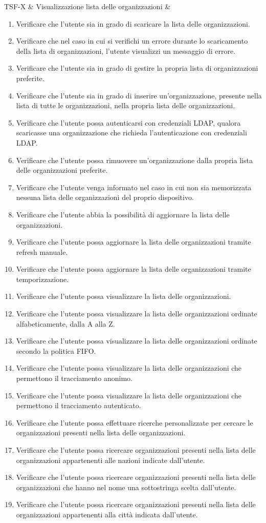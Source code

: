 TSF-X & Visualizzazione lista delle organizzazioni & \begin{enumerate}
\item Verificare che l'utente sia in grado di scaricare la lista delle organizzazioni.
\item Verificare che nel caso in cui si verifichi un errore durante lo scaricamento della lista di organizzazioni, l'utente visualizzi un messaggio di errore.
\item Verificare che l'utente sia in grado di gestire la propria lista di organizzazioni preferite.
\item Verificare che l'utente sia in grado di inserire un'organizzazione, presente nella lista di tutte le organizzazioni,  nella propria lista delle organizzazioni.
\item Verificare che l'utente possa autenticarsi con credenziali LDAP, qualora scaricasse una organizzazione che richieda l'autenticazione con credenziali LDAP.
\item Verificare che l'utente possa rimuovere un'organizzazione dalla propria lista delle organizzazioni preferite.
\item Verificare che l'utente venga informato nel caso in cui non sia memorizzata nessuna lista delle organizzazioni del proprio dispositivo.
\item Verificare che l'utente abbia la possibilità di aggiornare la lista delle organizzazioni.
\item Verificare che l'utente possa aggiornare la lista delle organizzazioni tramite refresh manuale.
\item Verificare che l'utente possa aggiornare la lista delle organizzazioni tramite temporizzazione.
\item Verificare che l'utente possa visualizzare la lista delle organizzazioni.
\item Verificare che l'utente possa visualizzare la lista delle organizzazioni ordinate alfabeticamente, dalla A alla Z.
\item Verificare che l'utente possa visualizzare la lista delle organizzazioni ordinate secondo la politica FIFO.
\item Verificare che l'utente possa visualizzare la lista delle organizzazioni che permettono il tracciamento anonimo.
\item Verificare che l'utente possa visualizzare la lista delle organizzazioni che permettono il tracciamento autenticato.
\item Verificare che l'utente possa effettuare ricerche personalizzate per cercare le organizzazioni presenti nella lista delle organizzazioni.
\item Verificare che l'utente possa ricercare organizzazioni presenti nella lista delle organizzazioni appartenenti alle nazioni indicate dall'utente.
\item  Verificare che l'utente possa ricercare organizzazioni presenti nella lista delle organizzazioni che hanno nel nome una sottostringa scelta dall'utente.
\item  Verificare che l'utente possa ricercare organizzazioni presenti nella lista delle organizzazioni appartenenti alla città indicata dall'utente.
\end{enumerate}
